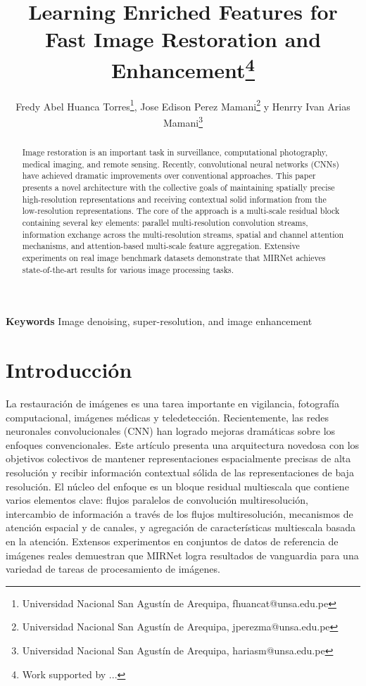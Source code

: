 \documentclass[a4paper,
               ]{jacow}
\newenvironment{keywords}
{\par\small\textbf{Keywords}}
{\par}
\begin{document}
\title{Learning Enriched Features for Fast Image Restoration and Enhancement\thanks{Work supported by ...}}

\author{Fredy Abel Huanca Torres\thanks{Universidad Nacional San Agustín de Arequipa, fhuancat@unsa.edu.pe},
		Jose Edison Perez Mamani\thanks{Universidad Nacional San Agustín de Arequipa, jperezma@unsa.edu.pe} y
		Henrry Ivan Arias Mamani\thanks{Universidad Nacional San Agustín de Arequipa, hariasm@unsa.edu.pe}}
	
\maketitle

%
\begin{abstract}
Image restoration is an important task in surveillance, computational photography, medical imaging, and remote sensing. Recently, convolutional neural networks (CNNs) have achieved dramatic improvements over conventional approaches. This paper presents a novel architecture with the collective goals of maintaining spatially precise high-resolution representations and receiving contextual solid information from the low-resolution representations. The core of the approach is a multi-scale residual block containing several key elements: parallel multi-resolution convolution streams, information exchange across the multi-resolution streams, spatial and channel attention mechanisms, and attention-based multi-scale feature aggregation. Extensive experiments on real image benchmark datasets demonstrate that MIRNet achieves state-of-the-art results for various image processing tasks.
\end{abstract}

\begin{keywords}
Image denoising, super-resolution, and image enhancement
\end{keywords}

\section{Introducción}

La restauración de imágenes es una tarea importante en vigilancia, fotografía computacional, imágenes médicas y teledetección. Recientemente, las redes neuronales convolucionales (CNN) han logrado mejoras dramáticas sobre los enfoques convencionales. Este artículo presenta una arquitectura novedosa con los objetivos colectivos de mantener representaciones espacialmente precisas de alta resolución y recibir información contextual sólida de las representaciones de baja resolución. El núcleo del enfoque es un bloque residual multiescala que contiene varios elementos clave: flujos paralelos de convolución multiresolución, intercambio de información a través de los flujos multiresolución, mecanismos de atención espacial y de canales, y agregación de características multiescala basada en la atención. Extensos experimentos en conjuntos de datos de referencia de imágenes reales demuestran que MIRNet logra resultados de vanguardia para una variedad de tareas de procesamiento de imágenes.
\end{document}
